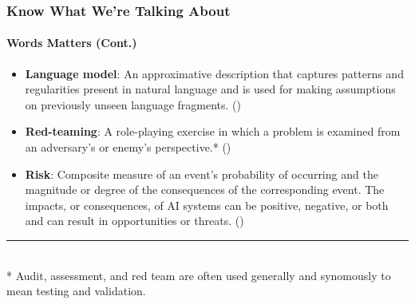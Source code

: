 \documentclass[11pt,
               aspectratio=169,
               hyperref={colorlinks}
               ]{beamer}
\begin{document}
		\begin{frame}
			
			\frametitle{Know What We're Talking About}
			\framesubtitle{Words Matters (Cont.)}
			
			\begin{itemize}
				
				\item \textbf{Language model}: An approximative description that captures patterns and regularities present in natural language and is used for making assumptions on previously unseen language fragments. (\cite{atherton2023language})

				\item \textbf{Red-teaming}: A role-playing exercise in which a problem is examined from an adversary’s or enemy’s perspective.* (\cite{atherton2023language})

				
				\item \textbf{Risk}: Composite measure of an event’s probability of occurring and the magnitude or degree of the consequences of the corresponding event. The impacts, or consequences, of AI systems can be positive, negative, or both and can result in opportunities or threats. (\cite{atherton2023language})

			\end{itemize}
			
			\vspace{10pt}
			\par\noindent\rule{100pt}{0.4pt}\\
			\vspace{5pt}
			\scriptsize{* Audit, assessment, and red team are often used generally and synomously to mean testing and validation.}
		
		\end{frame}
\end{document}
